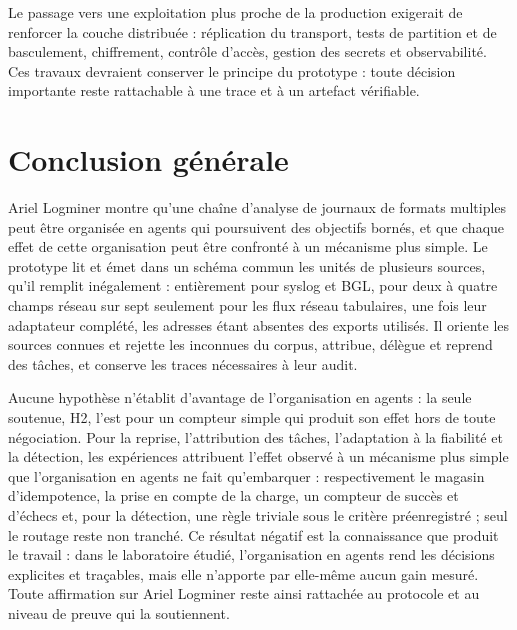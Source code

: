 Le passage vers une exploitation plus proche de la production exigerait de renforcer la couche distribuée : réplication du transport, tests de partition et de basculement, chiffrement, contrôle d'accès, gestion des secrets et observabilité. Ces travaux devraient conserver le principe du prototype : toute décision importante reste rattachable à une trace et à un artefact vérifiable.


\section*{Conclusion générale}

Ariel Logminer montre qu'une chaîne d'analyse de journaux de formats multiples peut être organisée en agents qui poursuivent des objectifs bornés, et que chaque effet de cette organisation peut être confronté à un mécanisme plus simple. Le prototype lit et émet dans un schéma commun les unités de plusieurs sources, qu'il remplit inégalement : entièrement pour syslog et BGL, pour deux à quatre champs réseau sur sept seulement pour les flux réseau tabulaires, une fois leur adaptateur complété, les adresses étant absentes des exports utilisés. Il oriente les sources connues et rejette les inconnues du corpus, attribue, délègue et reprend des tâches, et conserve les traces nécessaires à leur audit.

Aucune hypothèse n'établit d'avantage de l'organisation en agents : la seule soutenue, H2, l'est pour un compteur simple qui produit son effet hors de toute négociation. Pour la reprise, l'attribution des tâches, l'adaptation à la fiabilité et la détection, les expériences attribuent l'effet observé à un mécanisme plus simple que l'organisation en agents ne fait qu'embarquer : respectivement le magasin d'idempotence, la prise en compte de la charge, un compteur de succès et d'échecs et, pour la détection, une règle triviale sous le critère préenregistré ; seul le routage reste non tranché. Ce résultat négatif est la connaissance que produit le travail : dans le laboratoire étudié, l'organisation en agents rend les décisions explicites et traçables, mais elle n'apporte par elle-même aucun gain mesuré. Toute affirmation sur Ariel Logminer reste ainsi rattachée au protocole et au niveau de preuve qui la soutiennent.
